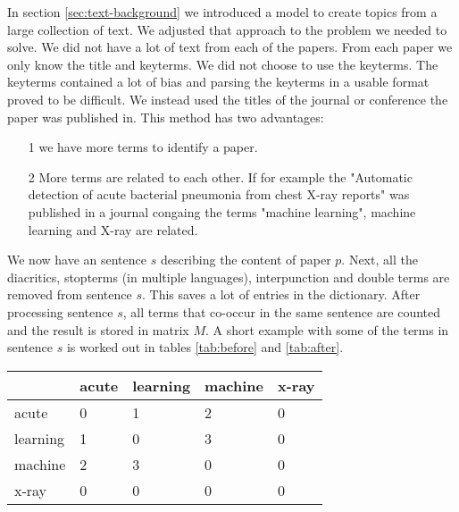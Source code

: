 
In section \ref{sec:text-background} we introduced a model to create topics from a large collection of text. We adjusted that approach to the problem we needed to solve. We did not have a lot of text from each of the papers. From each paper we only know the title and keyterms. We did not choose to use the keyterms. The keyterms contained a lot of bias and parsing the keyterms in a usable format proved to be difficult. We instead used the titles of the journal or conference the paper was published in. This method has two advantages:

\begin{itemize}
\item[1] we have more terms to identify a paper.
\item[2] More terms are related to each other. If for example the "Automatic detection of acute bacterial pneumonia from chest X-ray reports" was published in a journal congaing the terms "machine learning",  machine learning and X-ray are related. 
\end{itemize}

We now have an sentence $s$ describing the content of paper $p$. Next, all the diacritics, stopterms (in multiple languages), interpunction and double terms are removed from sentence $s$. This saves a lot of entries in the dictionary\cite{chowdhury2010introduction}. After processing sentence $s$, all terms that co-occur in the same sentence are counted and the result is stored in matrix $M$. A short example with some of the terms in sentence $s$ is worked out in tables \ref{tab:before} and \ref{tab:after}.

\begin{table}
	\begin{center}
	

\begin{tabular}{|l|l|l|l|l|}
\hline
	 	& acute  & learning & machine &  x-ray \\ \hline
acute 	&	0 	& 	1 &	 2 &  0	 \\ \hline
learning&	1	&	0 &	 3 &  0	 \\ \hline
machine &	2	&	3 &	 0 &  0	 \\ \hline
x-ray	&	0	&	0 &	 0 &  0	 \\ \hline

\end{tabular} 
	\end{center}
\end{table}


